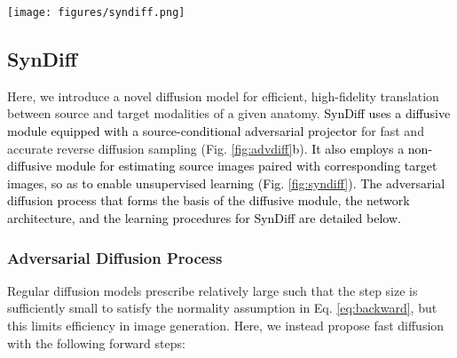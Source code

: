 \documentclass[journal,twoside,web]{ieeecolor}
\newcommand*{\revhl}{\textcolor{black}}
\begin{document}
\begin{figure*}[t]
\begin{minipage}{0.7\textwidth}
\centerline{\texttt{[image: figures/syndiff.png]}}
\end{minipage}
\begin{minipage}{0.3\textwidth}
\caption{For unsupervised learning, SynDiff leverages a cycle-consistent architecture that bilaterally translates between two modalities (, ). For synthesizing a target image  of modality , the diffusive module in Fig. \ref{fig:advdiff}b requires guidance from a source image  of modality  for the same anatomy. However, a paired source image of the same anatomy might be unavailable in the training set. To enable training on unpaired images, SynDiff uses a non-diffusive module to first estimate a paired source image  from . \revhl{Similarly, for synthesizing a target image  of modality  with the diffusive module, the non-diffusive module first estimates a paired source image  from .} \textbf{a)} To do this, the non-diffusive module comprises two generator-discriminator pairs (, ) that generate initial translation estimates for  (orange) and  (green). \textbf{b)} These initial translation estimates  are then used as guiding source-modality images in the diffusive module. For cycle-consistent learning, the diffusive module also comprises two generator-discriminator pairs (, ) to generate denoised image estimates for  (yellow) and  (blue).}
\label{fig:syndiff}
\end{minipage}
\hfill
\end{figure*}


\subsection{SynDiff}
Here, we introduce a novel diffusion model for efficient, high-fidelity translation between source and target modalities of a given anatomy. \revhl{SynDiff uses a diffusive module equipped with a source-conditional adversarial projector} for fast and accurate reverse diffusion sampling (Fig. \ref{fig:advdiff}b). \revhl{It also employs a non-diffusive module for estimating source images paired with corresponding target images, so as to enable unsupervised learning (Fig. \ref{fig:syndiff}). The adversarial diffusion process that forms the basis of the diffusive module, the network architecture, and the learning procedures for SynDiff are detailed below.}

\subsubsection{Adversarial Diffusion Process}
\label{sec:adp}
Regular diffusion models prescribe relatively large  such that the step size is sufficiently small to satisfy the normality assumption in Eq. \ref{eq:backward}, but this limits efficiency in image generation. Here, we instead propose fast diffusion with the following forward steps:
\end{document}

